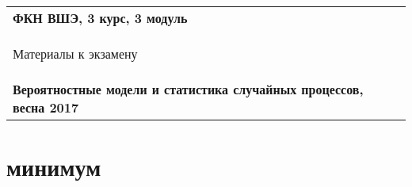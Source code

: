 \documentclass[a4paper,12pt]{extreport}
\renewcommand{\=}[1]{\stackrel{#1}{=}} %
\begin{document}
\begin{center}
    \begin{tabular}{|p{15.5cm}|}
        \hline
        \textbf{ФКН ВШЭ, 3 курс, 3 модуль}\\
        \begin{center} \Large Материалы к экзамену
        \end{center}\\
        \textbf{Вероятностные модели и статистика случайных процессов, весна 2017}\\
        \hline
    \end{tabular}
\end{center}






\section*{ минимум}
\end{document}
